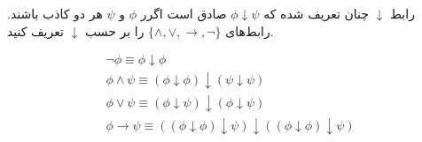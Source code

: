 رابط $\downarrow$ چنان تعریف شده که $\phi\downarrow\psi$ صادق است اگرر $\phi$ و $\psi$ هر دو کاذب باشند. رابط‌های
$\{\wedge,\vee,\to,\neg\}$
را بر حسب $\downarrow$ تعریف کنید.
\begin{ans}
    \begin{gather*}
        \neg\phi\equiv\phi\downarrow\phi \\
        \phi\wedge\psi\equiv(\phi\downarrow\phi)\downarrow(\psi\downarrow\psi) \\
        \phi\vee\psi\equiv(\phi\downarrow\psi)\downarrow(\phi\downarrow\psi) \\
        \phi\to\psi\equiv((\phi\downarrow\phi)\downarrow\psi)\downarrow((\phi\downarrow\phi)\downarrow\psi)
    \end{gather*}
\end{ans}
